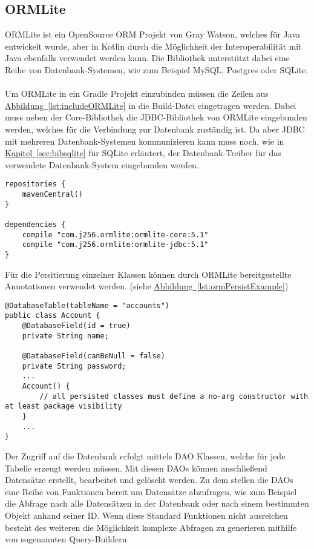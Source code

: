 \subsection{ORMLite}\label{sec:bibormlite}
ORMLite ist ein OpenSource \gls{ORM} Projekt von Gray Watson, welches für Java entwickelt wurde, aber in Kotlin durch die Möglichkeit der Interoperabilität mit Java ebenfalls verwendet werden kann. Die Bibliothek unterstützt dabei eine Reihe von Datenbank-Systemen, wie zum Beispiel MySQL, Postgres oder SQLite.\\
\\
Um ORMLite in ein Gradle Projekt einzubinden müssen die Zeilen aus \hyperref[lst:includeORMLite]{Abbildung~\ref{lst:includeORMLite}} in die Build-Datei eingetragen werden. Dabei muss neben der Core-Bibliothek die \gls{JDBC}-Bibliothek von ORMLite eingebunden werden, welches für die Verbindung zur Datenbank zuständig ist. Da aber \gls{JDBC} mit mehreren Datenbank-Systemen kommunizieren kann muss noch, wie in \hyperref[sec:bibsqlite]{Kapitel~\ref{sec:bibsqlite}} für SQLite erläutert, der Datenbank-Treiber für das verwendete Datenbank-System eingebunden werden.
\begin{lstlisting}[style=lstStyleFramed, caption={Einbindung der Bibliothek ORMLite mithilfe von Gradle}, label=lst:includeORMLite]
repositories {
	mavenCentral()
}

dependencies {
	compile "com.j256.ormlite:ormlite-core:5.1"
	compile "com.j256.ormlite:ormlite-jdbc:5.1"
}
\end{lstlisting}
Für die Persitierung einzelner Klassen können durch ORMLite bereitgestellte Annotationen verwendet werden. (siehe \hyperref[lst:ormPersistExample]{Abbildung~\ref{lst:ormPersistExample}})
\begin{lstlisting}[style=lstStyleFramed, caption={[Beispiel: Persistierung einer Klasse mittels ORMLite\protect\footnote{Quelle: \cite{ormlite}}]Beispiel: Persistierung einer Klasse mittels ORMLite\protect\footnotemark},label=lst:ormPersistExample]
@DatabaseTable(tableName = "accounts")
public class Account {
	@DatabaseField(id = true)
	private String name;

	@DatabaseField(canBeNull = false)
	private String password;
	...
	Account() {
		// all persisted classes must define a no-arg constructor with at least package visibility
	}
	...    
}
\end{lstlisting}
Der Zugriff auf die Datenbank erfolgt mittels \gls{DAO} Klassen, welche für jede Tabelle erzeugt werden müssen. Mit diesen \glspl{DAO} können anschließend Datensätze erstellt, bearbeitet und gelöscht werden. Zu dem stellen die \glspl{DAO} eine Reihe von Funktionen bereit um Datensätze abzufragen, wie zum Beispiel die Abfrage nach alle Datensätzen in der Datenbank oder nach einem bestimmten Objekt anhand seiner ID. Wenn diese Standard Funktionen nicht ausreichen besteht des weiteren die Möglichkeit komplexe Abfragen zu generieren mithilfe von sogenannten Query-Buildern.
